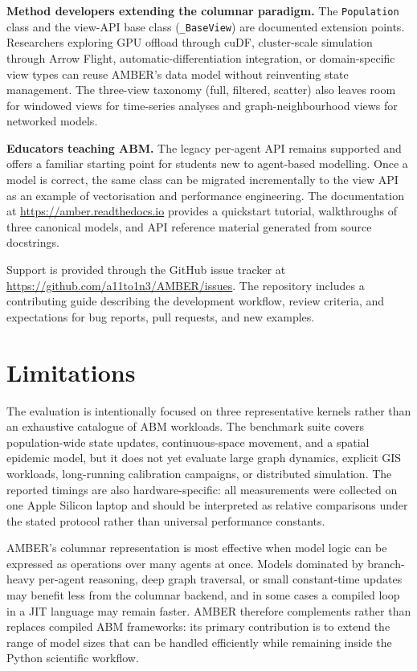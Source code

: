 \documentclass[11pt,a4paper]{article}
\begin{document}
\textbf{Method developers extending the columnar paradigm.} The \texttt{Population} class and the view-API base class (\texttt{\_BaseView}) are documented extension points. Researchers exploring GPU offload through cuDF, cluster-scale simulation through Arrow Flight, automatic-differentiation integration, or domain-specific view types can reuse AMBER's data model without reinventing state management. The three-view taxonomy (full, filtered, scatter) also leaves room for windowed views for time-series analyses and graph-neighbourhood views for networked models.

\textbf{Educators teaching ABM.} The legacy per-agent API remains supported and offers a familiar starting point for students new to agent-based modelling. Once a model is correct, the same class can be migrated incrementally to the view API as an example of vectorisation and performance engineering. The documentation at \url{https://amber.readthedocs.io} provides a quickstart tutorial, walkthroughs of three canonical models, and API reference material generated from source docstrings.

Support is provided through the GitHub issue tracker at \url{https://github.com/a11to1n3/AMBER/issues}. The repository includes a contributing guide describing the development workflow, review criteria, and expectations for bug reports, pull requests, and new examples.

\section{Limitations}

The evaluation is intentionally focused on three representative kernels rather than an exhaustive catalogue of ABM workloads. The benchmark suite covers population-wide state updates, continuous-space movement, and a spatial epidemic model, but it does not yet evaluate large graph dynamics, explicit GIS workloads, long-running calibration campaigns, or distributed simulation. The reported timings are also hardware-specific: all measurements were collected on one Apple Silicon laptop and should be interpreted as relative comparisons under the stated protocol rather than universal performance constants.

AMBER's columnar representation is most effective when model logic can be expressed as operations over many agents at once. Models dominated by branch-heavy per-agent reasoning, deep graph traversal, or small constant-time updates may benefit less from the columnar backend, and in some cases a compiled loop in a JIT language may remain faster. AMBER therefore complements rather than replaces compiled ABM frameworks: its primary contribution is to extend the range of model sizes that can be handled efficiently while remaining inside the Python scientific workflow.
\end{document}
